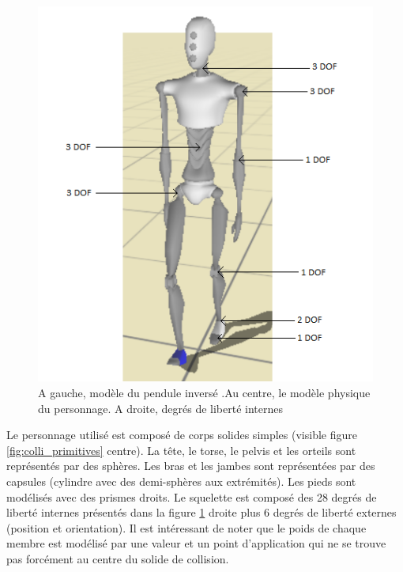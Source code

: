 \documentclass[runningheads,a4paper]{llncs}
\begin{document}
\begin{figure}[h]
\includegraphics[scale=0.5]{img_dof.png}
\caption{A gauche, modèle du pendule inversé \cite{coros2010generalized}.Au centre, le modèle physique du personnage. A droite, degrés de liberté internes}
\label{fig:ipm}
\label{fig:colli_primitives}
\label{fig:dof}
\end{figure}

Le personnage utilisé est composé de corps solides simples (visible figure \ref{fig:colli_primitives} centre). La tête, le torse, le pelvis et les orteils sont représentés par des sphères. Les bras et les jambes sont représentées par des capsules (cylindre avec des demi-sphères aux extrémités). Les pieds sont modélisés avec des prismes droits. Le squelette est composé des 28 degrés de liberté internes présentés dans la figure \ref{fig:dof} droite plus 6 degrés de liberté externes (position et orientation). Il est intéressant de noter que le poids de chaque membre est modélisé par une valeur et un point d'application qui ne se trouve pas forcément au centre du solide de collision.

%
\end{document}
